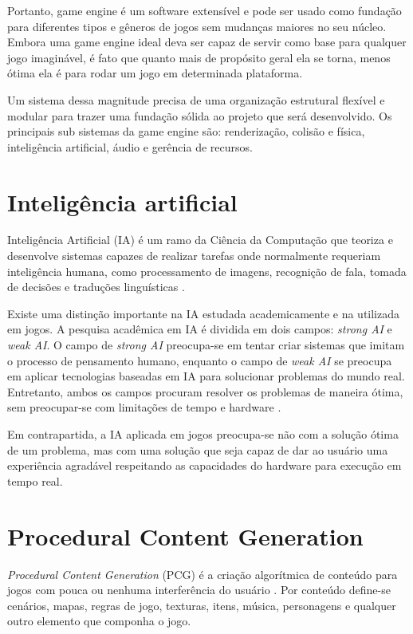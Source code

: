 \documentclass[12pt, 
openright, 
oneside, 
a4paper,    
brazil]{facom-ufu-abntex2}
\begin{document}
Portanto, game engine é um software extensível e pode ser usado como fundação para diferentes tipos e gêneros de jogos sem mudanças maiores no seu núcleo. Embora uma game engine ideal deva ser capaz de servir como base para qualquer jogo imaginável, é fato que quanto mais de propósito geral ela se torna, menos ótima ela é para rodar um jogo em determinada plataforma. 
 
Um sistema dessa magnitude precisa de uma organização estrutural flexível e modular para trazer uma fundação sólida ao projeto que será desenvolvido. Os principais sub sistemas da game engine são: renderização, colisão e física, inteligência artificial, áudio e gerência de recursos.
\section{Inteligência artificial}
Inteligência Artificial (IA) é um ramo da Ciência da Computação que teoriza e desenvolve sistemas capazes de realizar tarefas onde normalmente requeriam inteligência humana, como processamento de imagens, recognição de fala, tomada de decisões e traduções linguísticas \cite{AIDefinition}.

 Existe uma distinção importante na IA estudada academicamente e na utilizada em jogos. A pesquisa acadêmica em IA é dividida em dois campos: \textit{strong AI} e \textit{weak AI}. O campo de \textit{strong AI} preocupa-se em tentar criar sistemas que imitam o processo de pensamento humano, enquanto o campo de \textit{weak AI} se preocupa em aplicar tecnologias baseadas em IA para solucionar problemas do mundo real. Entretanto, ambos os campos procuram resolver os problemas de maneira ótima, sem preocupar-se com limitações de tempo e hardware \cite{ProgrammingGameAIByExample}.

Em contrapartida, a IA aplicada em jogos preocupa-se não com a solução ótima de um problema, mas com uma solução que seja capaz de dar ao usuário uma experiência agradável respeitando as capacidades do hardware para execução em tempo real.
\section{Procedural Content Generation}
\textit{Procedural Content Generation} (PCG) é a criação algorítmica de conteúdo para jogos com pouca ou nenhuma interferência do usuário \cite{ProceduralContentGenerationInGames}. Por conteúdo define-se cenários, mapas, regras de jogo, texturas, itens, música, personagens e qualquer outro elemento que componha o jogo.
\end{document}
